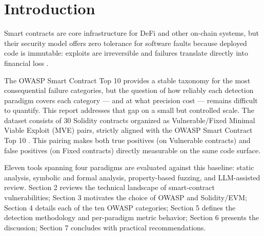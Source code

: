 \section{Introduction}

Smart contracts are core infrastructure for DeFi and other on-chain systems, but their security model offers zero tolerance for software faults because deployed code is immutable: exploits are irreversible and failures translate directly into financial loss \cite{acm_lifecycle_2025, nature_taxonomic_2024}. 

The OWASP Smart Contract Top 10 \cite{owasp_top10} provides a stable taxonomy for the most consequential failure categories, but the question of how reliably each detection paradigm covers each category — and at what precision cost — remains difficult to quantify. This report addresses that gap on a small but controlled scale. The dataset consists of 30 Solidity contracts organized as Vulnerable/Fixed Minimal Viable Exploit (MVE) pairs, strictly aligned with the OWASP Smart Contract Top 10 \cite{owasp_top10}. This pairing makes both true positives (on Vulnerable contracts) and false positives (on Fixed contracts) directly measurable on the same code surface.

Eleven tools spanning four paradigms are evaluated against this baseline: static analysis, symbolic and formal analysis, property-based fuzzing, and LLM-assisted review. Section 2 reviews the technical landscape of smart-contract vulnerabilities; Section 3 motivates the choice of OWASP and Solidity/EVM; Section 4 details each of the ten OWASP categories; Section 5 defines the detection methodology and per-paradigm metric behavior; Section 6 presents the discussion; Section 7 concludes with practical recommendations.